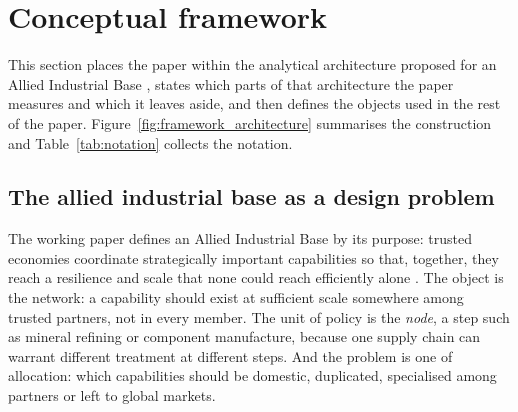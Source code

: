 \section{Conceptual framework}\label{sec:framework}

This section places the paper within the analytical architecture proposed for an Allied
Industrial Base \citep{neis2026allied}, states which parts of that architecture the paper
measures and which it leaves aside, and then defines the objects used in the rest of the paper.
Figure~\ref{fig:framework_architecture} summarises the construction and Table~\ref{tab:notation}
collects the notation.

\subsection{The allied industrial base as a design problem}\label{subsec:framework_aib}

The working paper defines an Allied Industrial Base by its purpose: trusted economies coordinate
strategically important capabilities so that, together, they reach a resilience and scale that
none could reach efficiently alone \citep{neis2026allied}. The object is
the network: a capability should exist at sufficient scale somewhere among trusted partners, not
in every member. The unit of policy is the \emph{node}, a step such as mineral refining or
component manufacture, because one supply chain can warrant different treatment at different
steps. And the problem is one of allocation: which capabilities should be domestic, duplicated,
specialised among partners or left to global markets.

